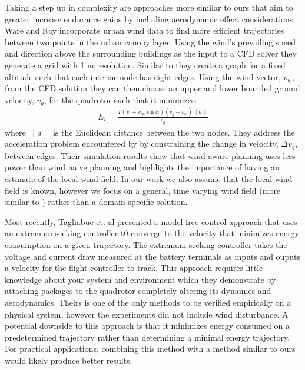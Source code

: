 Taking a step up in complexity are approaches more similar to ours that aim to greater increase endurance gains by including aerodynamic effect considerations. Ware and Roy \cite{ware2016analysis} incorporate urban wind data to find more efficient trajectories between two points in the urban canopy layer. Using the wind's prevailing speed and direction above the surrounding buildings as the input to a CFD solver they generate a grid with 1 m resolution. Similar to \cite{di2015energy} they create a graph for a fixed altitude such that each interior node has eight edges. Using the wind vector, $v_w$, from the CFD solution they can then choose an upper and lower bounded ground velocity, $v_g$, for the quadrotor such that it minimizes:
\begin{align*}
    E_i = \frac{T(v_i + v_\infty \sin{\alpha}) (v_g - v_w) \|d\|}{v_g}
\end{align*}
where $\|d\|$ is the Euclidean distance between the two nodes. They address the acceleration problem encountered by \cite{di2015energy} by constraining the change in velocity, $\Delta v_g$, between edges. Their simulation results show that wind aware planning uses less power than wind naive planning and highlights the importance of having an estimate of the local wind field. In our work we also assume that the local wind field is known, however we focus on a general, time varying wind field (more similar to \cite{kai2017nonlinear}) rather than a domain specific solution.

Most recently, Tagliabue et. al \cite{tagliabue2019model} presented a model-free control approach that uses an extremum seeking controller t0 converge to the velocity that minimizes energy consumption on a given trajectory. The extremum seeking controller takes the voltage and current draw measured at the battery terminals as inputs and ouputs a velocity for the flight controller to track. This approach requires little knowledge about your system and environment which they demonstrate by attaching packages to the quadrotor completely altering its dynamics and aerodynamics. Theirs is one of the only methods to be verified empirically on a physical system, however the experiments did not include wind disturbance. A potential downside to this approach is that it minimizes energy consumed on a predetermined trajectory rather than determining a minimal energy trajectory. For practical applications, combining this method with a method similar to ours would likely produce better results. 


